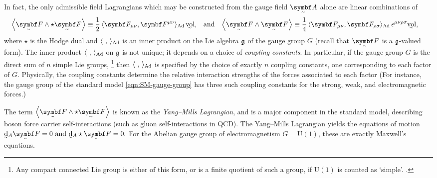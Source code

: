In fact, the only admissible field Lagrangians which may be constructed from the gauge field $\tsbm A$ alone are linear combinations of
\begin{align}
	\ang{\tsbm F \wedge \star\tsbm F} &\equiv \frac12\angg{\bm F_{\mu\nu}, \bm F^{\mu\nu}}\vol
,&	&\text{and}
&	\ang{\tsbm F \wedge \tsbm F} &\equiv \frac14\angg{\bm F_{\mu\nu}, \bm F_{\rho\sigma}}\epsilon^{\mu\nu\rho\sigma}\vol
,\end{align}
where $\star$ is the Hodge dual and $\angg{\ ,\ }$ is an inner product on the Lie algebra $\frak g$ of the gauge group $G$ (recall that $\tsbm F$ is a $\frak g$-valued form).
The inner product $\angg{\ ,\ }$ on $\frak g$ is not unique; it depends on a choice of \emph{coupling constants}.
In particular, if the gauge group $G$ is the direct sum of $n$ simple Lie groups,%
\footnote{
	Any compact connected Lie group is either of this form, or is a finite quotient of such a group, if $\mathrm U(1)$ is counted as `simple'. \cite[§\,2.4.3]{Hamilton_2017}.
}
then $\angg{\ ,\ }$ is specified by the choice of exactly $n$ coupling constants, one corresponding to each factor of $G$.
Physically, the coupling constants determine the relative interaction strengths of the forces associated to each factor \cite[§\,2.5]{Hamilton_2017}
(For instance, the gauge group of the standard model \eqref{eqn:SM-gauge-group} has three such coupling constants for the strong, weak, and electromagnetic forces.)

The term $\ang{\tsbm F \wedge\star \tsbm F}$ is known as the \emph{Yang--Mills Lagrangian}, and is a major component in the standard model, describing boson force carrier self-interactions (such as gluon self-interactions in QCD).
The Yang--Mills Lagrangian yields\footnotemark{} the equations of motion 
\begin{math}
	\ts\dd_A\tsbm F = 0
	\text{ and }
	\ts\dd_A\star\tsbm F = 0
.\end{math}
For the Abelian gauge group of electromagnetism $G = \mathrm{U}(1)$, these are exactly Maxwell's equations.

